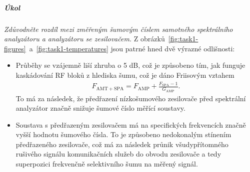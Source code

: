 \documentclass[11pt,a4paper]{article}
\begin{document}
\subparagraph*{Úkol} \emph{Zdůvodněte rozdíl mezi změřeným šumovým číslem samotného spektrálního analyzátoru a analyzátoru se zesilovačem.} Z obrázků~\ref{fig:task1-figures}~a~\ref{fig:task1-temperatures} jsou patrné hned dvě výrazné odlišnosti:
\begin{itemize}
    \item Průběhy se vzájemně liší zhruba o 5 dB, což je způsobeno tím, jak funguje kaskádování RF bloků z hlediska šumu, což je dáno Friisovým vztahem
    \begin{align}
        F_{\mathrm{AMT+SPA}} = F_{\mathrm{AMP}} + \frac{F_{\mathrm{SPA}}-1}{G_{\mathrm{AMP}}}.
    \end{align}
    To má za následek, že předřazení nízkošumového zesilovače před spektrální analyzátor značně snižuje šumové číslo měřící soustavy.
    \item Soustava s předřazeným zesilovačem má na specifických frekvencích značně vyšší hodnotu šumového čísla. To je způsobeno nedokonalým stínením předřazeného zesilovače, což má za následek průnik všudypřítomného rušivého signálu komunikačních služeb do obvodu zesilovače a tedy superpozici frekvenčně selektivního šumu na měřený signál.
\end{itemize}


\end{document}
